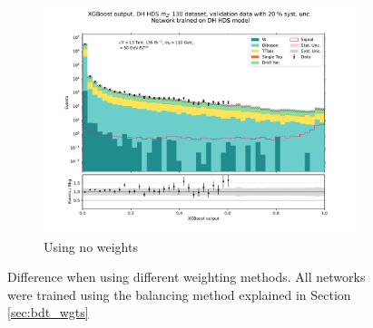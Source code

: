 \documentclass[12pt, a4paper]{book}
\begin{document}
\begin{figure}[!ht]
\begin{subfigure}[b]{0.49\textwidth}
      \includegraphics[width=1\textwidth]{No_wgt/VAL.pdf}
      \caption{Using no weights}
   \end{subfigure}
   \caption[Difference when using different weighting methods on BDTs]{Difference when using different weighting methods. All networks were trained using the balancing method explained in Section \ref{sec:bdt_wgts}}\label{fig:BDT_wgts}
\end{figure}
\end{document}
